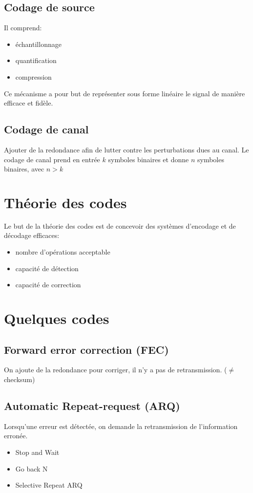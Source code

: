 \documentclass[a4paper,10pt,twocolumn]{article}
\theoremstyle{break}
\begin{document}
\subsection{Codage de source}
Il comprend:
\begin{itemize}
 \item échantillonnage
 \item quantification
 \item compression
\end{itemize}
Ce mécanisme a pour but de représenter sous forme linéaire le signal de manière efficace et fidèle.

\subsection{Codage de canal}
Ajouter de la redondance afin de lutter contre les perturbations dues au canal. 
Le codage de canal prend en entrée $k$ symboles binaires et donne $n$ symboles binaires, avec $n > k$

\section{Théorie des codes}
Le but de la théorie des codes est de concevoir des systèmes d'encodage et de décodage efficaces:
\begin{itemize}
 \item nombre d'opérations acceptable
 \item capacité de détection
 \item capacité de correction
\end{itemize}

\section{Quelques codes}
\subsection{Forward error correction (FEC)}
On ajoute de la redondance pour corriger, il n'y a pas de retransmission. ($ \ne $ checksum)

\subsection{Automatic Repeat-request (ARQ)}
Lorsqu'une erreur est détectée, on demande la retransmission de l'information erronée.
\begin{itemize}
 \item Stop and Wait
 \item Go back N
 \item Selective Repeat ARQ
\end{itemize}
\end{document}
